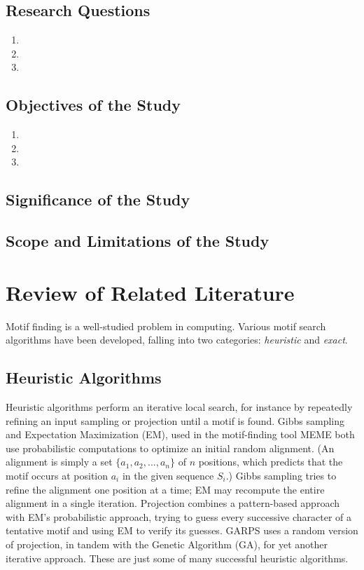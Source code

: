 \documentclass[oneside,12pt]{DISCSthesis}
\begin{document}
	\section{Research Questions}
		\begin{enumerate}
		\item
		\item
		\item
		\end{enumerate}

	\section{Objectives of the Study}
		\begin{enumerate}
		\item
		\item
		\item
		\end{enumerate}

	\section{Significance of the Study}

	\section{Scope and Limitations of the Study}

\chapter{Review of Related Literature}
	Motif finding is a well-studied problem in computing. Various motif search algorithms have been developed,
	falling into two categories: \emph{heuristic} and \emph{exact}.
	
	\section{Heuristic Algorithms}
		Heuristic algorithms perform an iterative local search, for instance by repeatedly refining an input sampling or projection until a motif is found. Gibbs sampling \cite{lawrence1993detecting} and Expectation Maximization (EM), used in the motif-finding tool MEME \cite{lawrence1990expectation,bailey1995unsupervised} both use probabilistic computations to optimize an initial random alignment. (An alignment is simply a set $\{a_{1}, a_{2},...,a_{n}\}$ of $n$ positions, which predicts that the motif occurs at position $a_{i}$ in the given sequence $S_{i}$.) Gibbs sampling tries to refine the alignment one position at a time; %
		EM may recompute the entire alignment in a single iteration. Projection \cite{blanchette2002discovery} combines a pattern-based approach with EM's probabilistic approach, trying to guess every successive character of a tentative motif and using EM to verify its guesses. GARPS \cite{huo2009combining} uses a random version of projection, in tandem with the Genetic Algorithm (GA), for yet another iterative approach. These are just some of many successful heuristic algorithms.
\end{document}
